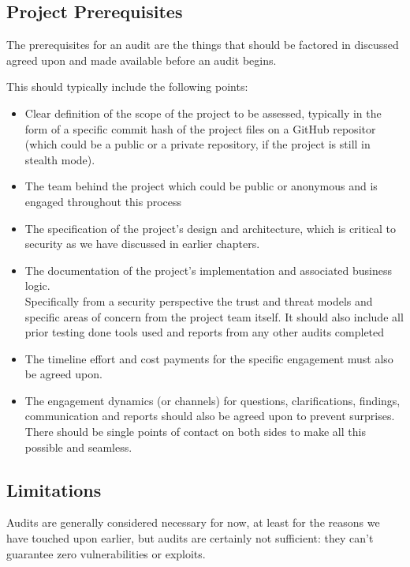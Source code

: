 \subsection{Project Prerequisites}\label{project-prerequisites}

The prerequisites for an audit are the things that should be factored in
discussed agreed upon and made available before an audit begins.

This should typically include the following points:

\begin{itemize}
\item
  Clear definition of the scope of the project to be assessed, typically
  in the form of a specific commit hash of the project files on a GitHub
  repositor (which could be a public or a private repository, if the
  project is still in stealth mode).
\item
  The team behind the project which could be public or anonymous and is
  engaged throughout this process
\item
  The specification of the project's design and architecture, which is
  critical to security as we have discussed in earlier chapters.
\item
  The documentation of the project's implementation and associated
  business logic.\\

  Specifically from a security perspective the trust and threat models
  and specific areas of concern from the project team itself. It should
  also include all prior testing done tools used and reports from any
  other audits completed
\item
  The timeline effort and cost payments for the specific engagement must
  also be agreed upon.
\item
  The engagement dynamics (or channels) for questions, clarifications,
  findings, communication and reports should also be agreed upon to
  prevent surprises. There should be single points of contact on both
  sides to make all this possible and seamless.
\end{itemize}

\subsection{Limitations}\label{limitations}

Audits are generally considered necessary for now, at least for the
reasons we have touched upon earlier, but audits are certainly not
sufficient: they can't guarantee zero vulnerabilities or exploits.

